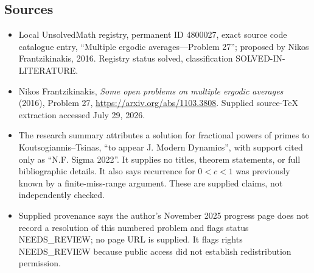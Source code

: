 \documentclass[11pt]{article}
\begin{document}
\subsection{Sources}
\begin{itemize}
\item Local UnsolvedMath registry, permanent ID 4800027, exact source code catalogue entry, ``Multiple ergodic averages---Problem 27''; proposed by Nikos Frantzikinakis, 2016. Registry status solved, classification SOLVED-IN-LITERATURE.
\item Nikos Frantzikinakis, \emph{Some open problems on multiple ergodic averages} (2016), Problem 27, \url{https://arxiv.org/abs/1103.3808}. Supplied source-TeX extraction accessed July 29, 2026.
\item The research summary attributes a solution for fractional powers of primes to Koutsogiannis--Tsinas, ``to appear J. Modern Dynamics'', with support cited only as ``N.F. Sigma 2022''. It supplies no titles, theorem statements, or full bibliographic details. It also says recurrence for $0<c<1$ was previously known by a finite-miss-range argument. These are supplied claims, not independently checked.
\item Supplied provenance says the author's November 2025 progress page does not record a resolution of this numbered problem and flags status NEEDS\_REVIEW; no page URL is supplied. It flags rights NEEDS\_REVIEW because public access did not establish redistribution permission.
\end{itemize}
\end{document}

